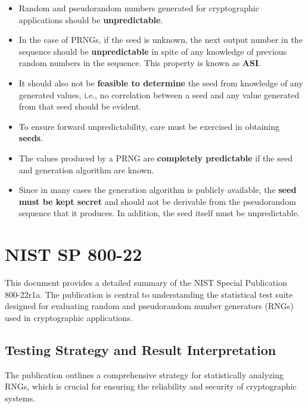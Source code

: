 \documentclass[12pt,openany]{book}
\theoremstyle{definition}
\begin{document}
\begin{itemize}
	\item Random and pseudorandom numbers generated for cryptographic applications should be \textbf{unpredictable}.
	\item In the case of PRNGs, if the seed is unknown, the next output number in the sequence should be \textbf{unpredictable} in spite of any knowledge of previous random numbers in the sequence. This property is known as \textbf{ASI}.
	\item It should also not be \textbf{feasible to determine} the seed from knowledge of any generated values, i.e., no correlation between a seed and any value generated from that seed should be evident.
	\item To ensure forward unpredictability, care must be exercised in obtaining \textbf{seeds}.
	\item The values produced by a PRNG are \textbf{completely predictable} if the seed and generation algorithm are known.
	\item Since in many cases the generation algorithm is publicly available, the \textbf{seed must be kept secret} and should not be derivable from the pseudorandom sequence that it produces. In addition, the seed itself must be unpredictable.
\end{itemize}







	
	
	\newpage
	\chapter{NIST SP 800-22}
	This document provides a detailed summary of the NIST Special Publication 800-22r1a. The publication is central to understanding the statistical test suite designed for evaluating random and pseudorandom number generators (RNGs) used in cryptographic applications.
	
	\section{Testing Strategy and Result Interpretation}
	The publication outlines a comprehensive strategy for statistically analyzing RNGs, which is crucial for ensuring the reliability and security of cryptographic systems.
	
\end{document}

